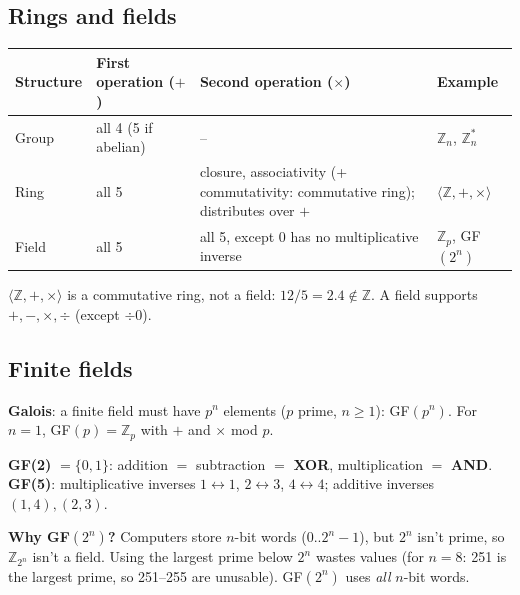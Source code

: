 \subsection{Rings and fields}
\begin{center}\small
\begin{tabularx}{\textwidth}{@{}l X X l@{}}
\toprule
Structure & First operation ($+$) & Second operation ($\times$) & Example\\
\midrule
Group & all 4 (5 if abelian) & -- & $\mathbb{Z}_n$, $\mathbb{Z}_n^*$\\
Ring & all 5 & closure, associativity (+ commutativity: commutative ring); distributes over $+$ & $\langle \mathbb{Z}, +, \times \rangle$\\
Field & all 5 & all 5, except 0 has no multiplicative inverse & $\mathbb{Z}_p$, GF$(2^n)$\\
\bottomrule
\end{tabularx}
\end{center}
$\langle \mathbb{Z}, +, \times\rangle$ is a commutative ring, not a field: $12 / 5 = 2.4 \notin \mathbb{Z}$. A field supports $+, -, \times, \div$ (except $\div 0$).

\subsection{Finite fields}
\begin{keybox}
\textbf{Galois}: a finite field must have $p^n$ elements ($p$ prime, $n \ge 1$): GF$(p^n)$. For $n = 1$, GF$(p) = \mathbb{Z}_p$ with $+$ and $\times$ mod $p$.
\end{keybox}
\textbf{GF(2)} $= \{0, 1\}$: addition $=$ subtraction $=$ \textbf{XOR}, multiplication $=$ \textbf{AND}. \textbf{GF(5)}: multiplicative inverses $1 \leftrightarrow 1$, $2 \leftrightarrow 3$, $4 \leftrightarrow 4$; additive inverses $(1,4), (2,3)$.

\textbf{Why GF$(2^n)$?} Computers store $n$-bit words ($0..2^n - 1$), but $2^n$ isn't prime, so $\mathbb{Z}_{2^n}$ isn't a field. Using the largest prime below $2^n$ wastes values (for $n = 8$: 251 is the largest prime, so 251--255 are unusable). GF$(2^n)$ uses \emph{all} $n$-bit words.

